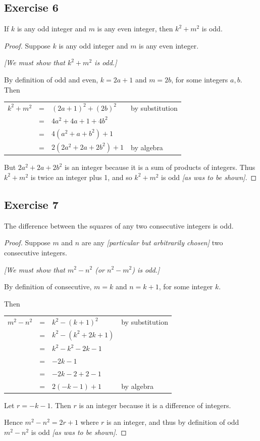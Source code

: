 \documentclass[14pt]{extarticle}
\newcommand{\cy}{\color{cyan}}
\begin{document}
\subsection{Exercise 6}
If $k$ is any odd integer and $m$ is any even integer, then $k^2 + m^2$ is odd.

\begin{proof}
Suppose $k$ is any odd integer and $m$ is any even integer. 

{\it [We must show that $k^2 + m^2$ is odd.]}

By definition of odd and even, $k = 2a+1$ and $m = 2b$, for some integers $a, b$. Then

\begin{center}
\begin{tabular}{rcll}
$k^2+m^2$ & = & $(2a+1)^2+(2b)^2$ & \cy by substitution \\
& = & $4a^2+4a+1+4b^2$ & \\
& = & $4(a^2+a+b^2)+1$ & \\
& = & $2(2a^2+2a+2b^2)+1$ & \cy by algebra \\
\end{tabular}
\end{center}

But $2a^2+2a+2b^2$ is an integer because it is a sum of products of integers. Thus $k^2+m^2$ is twice an integer plus 1, and so $k^2+m^2$ is odd {\it [as was to be shown]}.
\end{proof}

\subsection{Exercise 7}
The difference between the squares of any two consecutive integers is odd.

\begin{proof}
Suppose $m$ and $n$ are any {\it [particular but arbitrarily chosen]} two consecutive integers. 

{\it [We must show that $m^2-n^2$ (or $n^2-m^2$) is odd.]}

By definition of consecutive, $m = k$ and $n = k+1$, for some integer $k$. 

Then

\begin{center}
\begin{tabular}{rcll}
$m^2-n^2$ & = & $k^2 - (k+1)^2$ & \cy by substitution \\
& = & $k^2 - (k^2 + 2k + 1)$ & \\
& = & $k^2 - k^2 - 2k - 1$ & \\
& = & $-2k-1$ & \\
& = & $-2k-2+2-1$ & \\
& = & $2(-k-1)+1$ & \cy by algebra \\
\end{tabular}
\end{center}

Let $r = -k-1$. Then $r$ is an integer because it is a difference of integers. 

Hence $m^2 - n^2 = 2r+1$ where $r$ is an integer, and thus by definition of odd $m^2-n^2$ is odd {\it [as was to be shown]}.
\end{proof}
\end{document}

